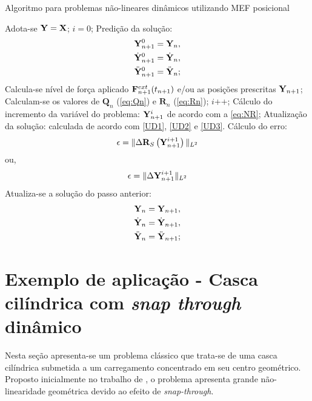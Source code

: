 \begin{algorithm}
	\caption{Algoritmo para problemas não-lineares dinâmicos utilizando MEF posicional}
	\label{alg:algoritmo_solid}
	\begin{algorithmic}[1]
		\State Adota-se $\mathbf{Y} = \mathbf{X}$;
		\State $i=0$;
		\State Predição da solução: 
		\begin{align}
		\mathbf{Y}_{n+1}^{0} = \mathbf{Y}_{n},\\
		\dot{\mathbf{Y}}_{n+1}^{0} = \dot{\mathbf{Y}}_{n},\\
		\ddot{\mathbf{Y}}_{n+1}^{0} = \ddot{\mathbf{Y}}_{n};
		\end{align}
		\State Calcula-se  nível de força aplicado $\mathbf{F}^{ext}_{n+1}(t_{n+1})$ e/ou as posições prescritas $\mathbf{Y}_{n+1}$;
		\State Calculam-se os valores de $\mathbf{Q}_n$ (\autoref{eq:Qn}) e $\mathbf{R}_n$ (\autoref{eq:Rn});
		\State $i$++;
		\State Cálculo do incremento da variável do problema: $\mathbf{Y}_{n+1}^{i}$ de acordo com a \autoref{eq:NR};
		\State Atualização da solução: calculada de acordo com \autoref{UD1}, \autoref{UD2} e \autoref{UD3}.
		\State Cálculo do erro:
		\begin{align}
		\epsilon = \lVert \Delta\mathbf{R}_S\left(\mathbf{Y}_{n+1}^{i+1}\right) \lVert_{L^2} 
		\end{align}
		ou,
		\begin{align}
		\epsilon = \lVert\Delta\mathbf{Y}_{n+1}^{i+1}\lVert_{L^2} 
		\end{align}
		\EndWhile
		\State Atualiza-se a solução do passo anterior:
		\begin{align}
		\mathbf{Y}_{n} = \mathbf{Y}_{n+1},\\
		\dot{\mathbf{Y}}_{n} = \dot{\mathbf{Y}}_{n+1},\\
		\ddot{\mathbf{Y}}_{n} = \ddot{\mathbf{Y}}_{n+1};
		\end{align}
		\EndFor
	\end{algorithmic}
\end{algorithm}

\section{Exemplo de aplicação - Casca cilíndrica com \textit{snap through} dinâmico}

Nesta seção apresenta-se um problema clássico que trata-se de uma casca cilíndrica submetida a um carregamento concentrado em seu centro geométrico. Proposto inicialmente no trabalho de 
\cite{KuhlR:1999}, o problema apresenta grande não-linearidade geométrica devido ao efeito de \textit{snap-through}. 

